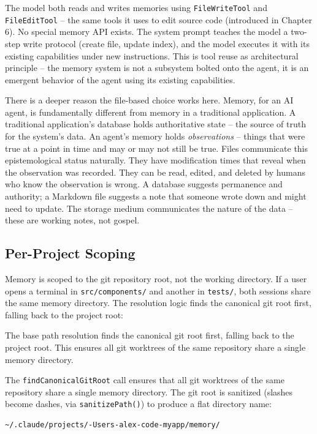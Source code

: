 \documentclass[
  english,
  11pt,
  letterpaper,
]{book}
\begin{document}
The model both reads and writes memories using \texttt{FileWriteTool}
and \texttt{FileEditTool} -- the same tools it uses to edit source code
(introduced in Chapter 6). No special memory API exists. The system
prompt teaches the model a two-step write protocol (create file, update
index), and the model executes it with its existing capabilities under
new instructions. This is tool reuse as architectural principle -- the
memory system is not a subsystem bolted onto the agent, it is an
emergent behavior of the agent using its existing capabilities.

There is a deeper reason the file-based choice works here. Memory, for
an AI agent, is fundamentally different from memory in a traditional
application. A traditional application's database holds authoritative
state -- the source of truth for the system's data. An agent's memory
holds \emph{observations} -- things that were true at a point in time
and may or may not still be true. Files communicate this epistemological
status naturally. They have modification times that reveal when the
observation was recorded. They can be read, edited, and deleted by
humans who know the observation is wrong. A database suggests permanence
and authority; a Markdown file suggests a note that someone wrote down
and might need to update. The storage medium communicates the nature of
the data -- these are working notes, not gospel.

\subsection{Per-Project Scoping}\label{per-project-scoping}

Memory is scoped to the git repository root, not the working directory.
If a user opens a terminal in \texttt{src/components/} and another in
\texttt{tests/}, both sessions share the same memory directory. The
resolution logic finds the canonical git root first, falling back to the
project root:

The base path resolution finds the canonical git root first, falling
back to the project root. This ensures all git worktrees of the same
repository share a single memory directory.

The \texttt{findCanonicalGitRoot} call ensures that all git worktrees of
the same repository share a single memory directory. The git root is
sanitized (slashes become dashes, via \texttt{sanitizePath()}) to
produce a flat directory name:

\begin{verbatim}
~/.claude/projects/-Users-alex-code-myapp/memory/
\end{verbatim}
\end{document}
